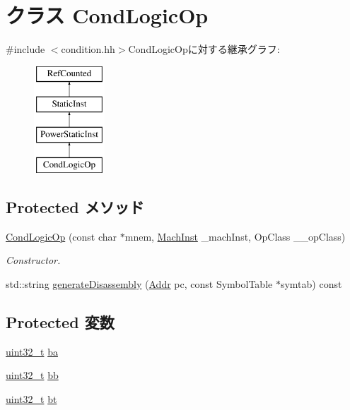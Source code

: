 \hypertarget{classPowerISA_1_1CondLogicOp}{
\section{クラス CondLogicOp}
\label{classPowerISA_1_1CondLogicOp}
}


{\ttfamily \#include $<$condition.hh$>$}CondLogicOpに対する継承グラフ:\begin{figure}[H]
\begin{center}
\leavevmode
\includegraphics[height=4cm]{classPowerISA_1_1CondLogicOp}
\end{center}
\end{figure}
\subsection*{Protected メソッド}
\begin{DoxyCompactItemize}
\item 
\hyperlink{classPowerISA_1_1CondLogicOp_a4002ce3e4b4b2733134fb7414bcb89b4}{CondLogicOp} (const char $\ast$mnem, \hyperlink{namespacePowerISA_a301c22ea09fa33dcfe6ddf22f203699c}{MachInst} \_\-machInst, OpClass \_\-\_\-opClass)
\begin{DoxyCompactList}\small\item\em Constructor. \item\end{DoxyCompactList}\item 
std::string \hyperlink{classPowerISA_1_1CondLogicOp_a95d323a22a5f07e14d6b4c9385a91896}{generateDisassembly} (\hyperlink{base_2types_8hh_af1bb03d6a4ee096394a6749f0a169232}{Addr} pc, const SymbolTable $\ast$symtab) const 
\end{DoxyCompactItemize}
\subsection*{Protected 変数}
\begin{DoxyCompactItemize}
\item 
\hyperlink{Type_8hh_a435d1572bf3f880d55459d9805097f62}{uint32\_\-t} \hyperlink{classPowerISA_1_1CondLogicOp_a308b637556f56bd59f2b395fe532d22c}{ba}
\item 
\hyperlink{Type_8hh_a435d1572bf3f880d55459d9805097f62}{uint32\_\-t} \hyperlink{classPowerISA_1_1CondLogicOp_a7760066aa9fbabdf004a08915f20d1af}{bb}
\item 
\hyperlink{Type_8hh_a435d1572bf3f880d55459d9805097f62}{uint32\_\-t} \hyperlink{classPowerISA_1_1CondLogicOp_a6434b34834e09b379ccca809448977c3}{bt}
\end{DoxyCompactItemize}


